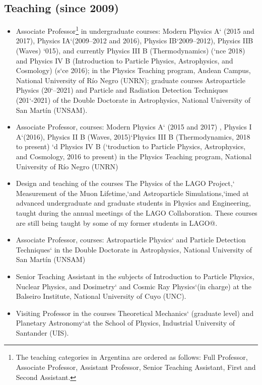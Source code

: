 \subsection*{Teaching (since 2009)}
\begin{itemize}
\ifres
\item Associate Professor\footnote{The teaching categories in Argentina are ordered as follows: Full Professor, Associate Professor, Assistant Professor, Senior Teaching Assistant, First and Second Assistant.} in undergraduate courses: Modern Physics A` (2015 and 2017), Physics IA`(2009--2012 and 2016), Physics IB`2009--2012), Physics IIB (Waves) `015), and currently Physics III B (Thermodynamics) (`nce 2018) and Physics IV B (Introduction to Particle Physics, Astrophysics, and Cosmology) (s`ce 2016); in the Physics Teaching program, Andean Campus, National University of Río Negro (UNRN); graduate courses Astroparticle Physics (20`--2021) and Particle and Radiation Detection Techniques (201`-2021) of the Double Doctorate in Astrophysics, National University of San Martín (UNSAM).
\else
\item {} Associate Professor, courses: Modern Physics A` (2015 and 2017) , Physics I A`(2016), Physics II B (Waves, 2015)`Physics III B (Thermodynamics, 2018 to present) `d Physics IV B (`troduction to Particle Physics, Astrophysics, and Cosmology, 2016 to present) in the Physics Teaching program, National University of Río Negro (UNRN) \item {} Design and teaching of the courses The Physics of the LAGO Project,` Measurement of the Muon Lifetime,`and Astroparticle Simulations,`imed at advanced undergraduate and graduate students in Physics and Engineering, taught during the annual meetings of the LAGO Collaboration. These courses are still being taught by some of my former students in LAGO@.
\item {} Associate Professor, courses: Astroparticle Physics` and Particle Detection Techniques`
in the Double Doctorate in Astrophysics, National University of San Martín (UNSAM)
\item {} Senior Teaching Assistant in the subjects of Introduction to Particle Physics, Nuclear Physics, and Dosimetry` and Cosmic Ray Physics`(in charge) at the Balseiro Institute, National University of Cuyo (UNC).
\item {} Visiting Professor in the courses Theoretical Mechanics` (graduate level) and Planetary Astronomy`at the School of Physics, Industrial University of Santander (UIS).

\end{itemize}
